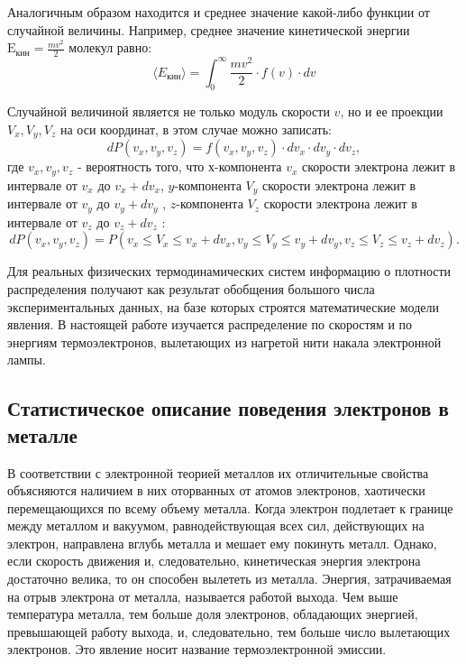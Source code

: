 \par
Аналогичным образом находится и среднее значение какой-либо функции
от случайной величины. Например, среднее значение кинетической энергии 
$\text{E}_\text{кин} =  \frac{mv^2}{2}$ молекул равно:
\begin{equation}
    \langle E_{\text{кин}} \rangle = \int_{0}^{\infty} \frac{mv^2}{2} \cdot f(v) \cdot dv
\end{equation}

\par 
Случайной величиной является не только модуль скорости $v$, но и ее
проекции $V_x , V_y ,V_z $ на оси координат, в этом случае можно записать:
\[dP(v_x, v_y, v_z) = f(v_x, v_y, v_z) \cdot 
dv_x \cdot dv_y \cdot dv_z, \]
где  $v_x,v_y ,v_z$ - вероятность того, что $х$-компонента $v_{x}$ скорости электрона лежит в интервале от $v_x$ до $v_x + dv_{x} $, $y$-компонента $V_y$ скорости электрона лежит в интервале от $v_y$ до $v_y + dv_y$ , $z$-компонента $V_z$ скорости электрона лежит в интервале от $v_z $ до $v_z +  dv_z$ :
\[dP (v_x,v_y ,v_z ) = P (v_x \leq V_x \leq v_x + dv_x ,v_y \leq V_y \leq v_y + dv_y ,v_z \leq V_z \leq v_z + dv_z ).\]

\par 
Для реальных физических термодинамических систем информацию о плотности
распределения получают как результат обобщения большого числа
экспериментальных данных, на базе которых строятся математические модели
явления. В настоящей работе изучается распределение по скоростям и по
энергиям термоэлектронов, вылетающих из нагретой нити накала электронной
лампы.

\subsection{Статистическое описание поведения электронов в металле}
\par 
В
соответствии с электронной теорией металлов их отличительные свойства
объясняются наличием в них оторванных от атомов электронов, хаотически
перемещающихся по всему объему металла. Когда электрон подлетает к границе
между металлом и вакуумом, равнодействующая всех сил, действующих на
электрон, направлена вглубь металла и мешает ему покинуть металл. Однако,
если скорость движения и, следовательно, кинетическая энергия электрона
достаточно велика, то он способен вылететь из металла. Энергия, затрачиваемая
на отрыв электрона от металла, называется работой выхода. Чем выше 
температура металла, тем больше доля электронов, обладающих энергией,
превышающей работу выхода, и, следовательно, тем больше число вылетающих
электронов. Это явление носит название термоэлектронной эмиссии.

